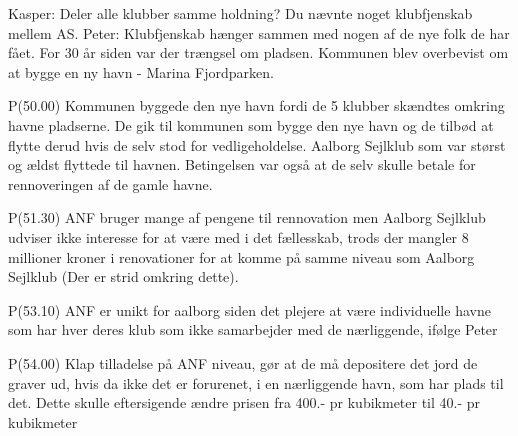 Kasper: Deler alle klubber samme holdning? Du nævnte noget klubfjenskab mellem AS. Peter: Klubfjenskab hænger sammen med nogen af de nye folk de har fået. For 30 år siden var der trængsel om pladsen. Kommunen blev overbevist om at bygge en ny havn - Marina Fjordparken.


P(50.00) Kommunen byggede den nye havn fordi de 5 klubber skændtes omkring havne
pladserne. De gik til kommunen som bygge den nye havn og de tilbød at flytte 
derud hvis de selv stod for vedligeholdelse. Aalborg Sejlklub som var størst og ældst
flyttede til havnen. Betingelsen var også at de selv skulle betale for rennoveringen
af de gamle havne.

P(51.30) ANF bruger mange af pengene til rennovation men Aalborg Sejlklub 
udviser ikke interesse for at være med i det fællesskab, trods der mangler
8 millioner kroner i renovationer for at komme på samme niveau som
Aalborg Sejlklub (Der er strid omkring dette).

P(53.10) ANF er unikt for aalborg siden det plejere at være individuelle havne
som har hver deres klub som ikke samarbejder med de nærliggende, ifølge Peter

P(54.00) Klap tilladelse på ANF niveau, gør at de må depositere det jord de graver ud,
hvis da ikke det er forurenet, i en nærliggende havn, som har plads til det.
Dette skulle eftersigende ændre prisen fra 400.- pr kubikmeter til 40.- pr kubikmeter
